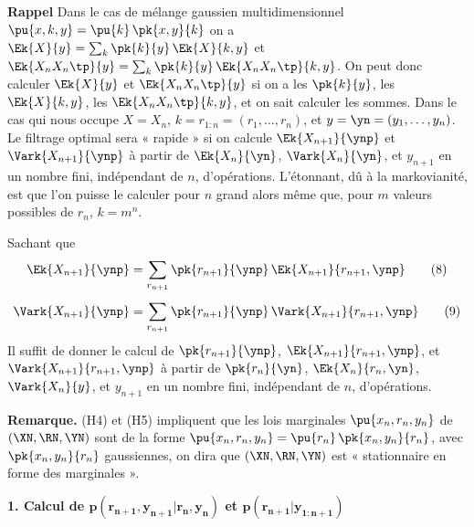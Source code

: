 \documentclass[12pt, a4paper]{article}
\begin{document}
\noindent\textbf{Rappel} Dans le cas de mélange gaussien multidimensionnel
$\pu{x, k, y} = \pu{k}\,\pk{x, y}{k}$ on a
$\Ek{X}{y} = \sum_k \pk{k}{y}\,\Ek{X}{k, y}$ et
$\Ek{X_n X_n\tp}{y} = \sum_k \pk{k}{y}\,\Ek{X_n X_n\tp}{k, y}$.
On peut donc calculer $\Ek{X}{y}$ et $\Ek{X_n X_n\tp}{y}$ si on a les $\pk{k}{y}$,
les $\Ek{X}{k, y}$, les $\Ek{X_n X_n\tp}{k, y}$, et on sait calculer les sommes.
Dans le cas qui nous occupe $X = X_n$, $k = r_{1:n} = (r_1, \ldots, r_n)$,
et $y = \yn = (y_1, \ldots, y_n)$. Le filtrage optimal sera « rapide » si on calcule
$\Ek{X_{n+1}}{\ynp}$ et $\Vark{X_{n+1}}{\ynp}$ à partir de $\Ek{X_n}{\yn}$,
$\Vark{X_n}{\yn}$, et $y_{n+1}$ en un nombre fini, indépendant de $n$, d'opérations.
L'étonnant, dû à la markovianité, est que l'on puisse le calculer pour $n$ grand alors même
que, pour $m$ valeurs possibles de $r_n$, $k = m^n$.

Sachant que
\begin{align}
  \Ek{X_{n+1}}{\ynp}
    &= \sum_{r_{n+1}} \pk{r_{n+1}}{\ynp}\,\Ek{X_{n+1}}{r_{n+1}, \ynp} \tag{8} \\[4pt]
  \Vark{X_{n+1}}{\ynp}
    &= \sum_{r_{n+1}} \pk{r_{n+1}}{\ynp}\,\Vark{X_{n+1}}{r_{n+1}, \ynp} \tag{9}
\end{align}
Il suffit de donner le calcul de $\pk{r_{n+1}}{\ynp}$, $\Ek{X_{n+1}}{r_{n+1}, \ynp}$,
et $\Vark{X_{n+1}}{r_{n+1}, \ynp}$ à partir de $\pk{r_n}{\yn}$, $\Ek{X_n}{r_n, \yn}$,
$\Vark{X_n}{y}$, et $y_{n+1}$ en un nombre fini, indépendant de $n$, d'opérations.

\medskip
\noindent\textbf{Remarque.} (H4) et (H5) impliquent que les lois marginales
$\pu{x_n, r_n, y_n}$ de $(\XN, \RN, \YN)$ sont de la forme
$\pu{x_n, r_n, y_n} = \pu{r_n}\,\pk{x_n, y_n}{r_n}$, avec $\pk{x_n, y_n}{r_n}$
gaussiennes, on dira que $(\XN, \RN, \YN)$ est « stationnaire en forme des marginales ».

\bigskip
\noindent\textbf{1. Calcul de $\bm{p(r_{n+1}, y_{n+1}|r_n, y_n)}$ et
  $\bm{p(r_{n+1}|y_{1:n+1})}$}
\end{document}

